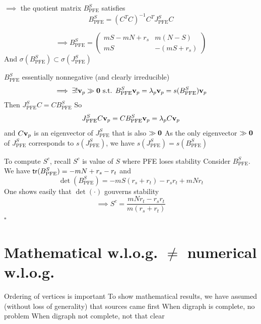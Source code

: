 \documentclass[aspectratio=169]{beamer}
\begin{document}
\begin{frame}
	$\implies$ the quotient matrix $B_{\textrm{PFE}}^S$ satisfies
\[
B_{\textrm{PFE}}^S = (C^TC)^{-1}C^TJ_{\textrm{PFE}}^SC
\label{eq:formulaJPPB}
\]

\[
\implies B_{\textrm{PFE}}^S = \begin{pmatrix}
mS - mN +r_s & m(N-S) \\
mS & -(mS + r_s)
\end{pmatrix}
\]
\vfill
And $\sigma(B_{\textrm{PFE}}^S) \subset \sigma(J_{\textrm{PFE}}^S)$
\end{frame}

\begin{frame}
	$B_{\textrm{PFE}}^S$ essentially nonnegative (and clearly irreducible)
	\[
	\implies\exists! \bv_p\gg \b0 
	\textrm{ s.t. }  B_{\textrm{PFE}}^S\bv_p = \lambda_p \bv_p=s(B_{\textrm{PFE}}^S)\bv_p
	\]
	\vfill 
	Then $J_{\textrm{PFE}}^SC=CB_{\textrm{PFE}}^S$
	\vfill
	So
	\begin{equation*}
		J_{\textrm{PFE}}^SC\mathbf{v}_p = CB_{\textrm{PFE}}^S\mathbf{v}_p = \lambda_p C \mathbf{v}_p
	\end{equation*}
	and $C\mathbf{v}_p$ is an eigenvector of $J_{\textrm{PFE}}^S$ that is also $\gg\b0$
	\vfill
	As the only eigenvector $\gg\b0$ of $J_{\textrm{PFE}}^S$ corresponds to $s(J_{\textrm{PFE}}^S)$, we have $s(J_{\textrm{PFE}}^S) = s(B_{\textrm{PFE}}^S)$ 
\end{frame}

\begin{frame}	
	To compute $S^c$, recall $S^c$ is value of $S$ where PFE loses stability
	\vfill
	Consider $B_{\textrm{PFE}}^S$. We have $\mathsf{tr}(B_{\textrm{PFE}}^S) = -mN +r_s-r_t$ and
	\[
		\det(B_{\textrm{PFE}}^S) = -mS(r_s+r_t) - r_sr_t  + mNr_t
	\]
	\vfill
	One shows easily that $\det(\cdot)$ gouverns stability
	\vfill
	\[
		\implies S^c = \frac{mNr_t-r_sr_t}{m(r_s+r_t)}
	\]
	\flushright$\square$
\end{frame}


\section[About w.l.o.g.]{Mathematical w.l.o.g. $\neq$ numerical w.l.o.g.}

\begin{frame}{Ordering of vertices is important}
	To show mathematical results, we have assumed (without loss of generality) that sources came first
	\vfill
	When digraph is complete, no problem
	\vfill
	When digraph not complete, not that clear
\end{frame}
\end{document}
